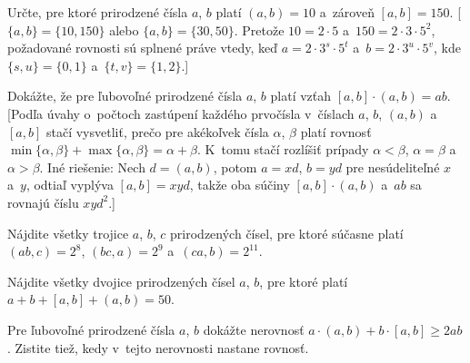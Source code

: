 {
Určte, pre ktoré prirodzené čísla $a$, $b$ platí
$(a,b)=10$ a~zároveň $[a,b]=150$. [$\{a,b\}=\{10,150\}$ alebo
$\{a,b\}=\{30,50\}$. Pretože $10=2\cdot5$
a~$150=2\cdot3\cdot5^2$, požadované rovnosti sú splnené práve vtedy, keď
$a=2\cdot3^{s}\cdot5^{t}$ a~$b=2\cdot3^{u}\cdot5^{v}$,
kde $\{s,u\}=\{0,1\}$ a~$\{t,v\}=\{1,2\}$.]

Dokážte, že pre ľubovoľné prirodzené čísla $a$, $b$ platí vzťah
$[a,b]\cdot(a,b)=ab$.
[Podľa úvahy o~počtoch zastúpení každého prvočísla
v~číslach $a$, $b$, $(a,b)$ a~$[a,b]$ stačí vysvetliť, prečo pre
akékoľvek čísla $\alpha$, $\beta$ platí rovnosť
$\min\{\alpha,\beta\}+\max\{\alpha,\beta\}=\alpha+\beta$. K~tomu stačí rozlíšiť
prípady $\alpha<\beta$, $\alpha=\beta$ a~$\alpha>\beta$.
Iné riešenie: Nech $d=(a,b)$, potom $a=xd$, $b=yd$
pre nesúdeliteľné $x$ a~$y$, odtiaľ vyplýva $[a,b]=xyd$, takže oba
súčiny $[a,b]\cdot(a,b)$ a~$ab$ sa rovnajú číslu $xyd^2$.]

Nájdite všetky trojice $a$, $b$, $c$ prirodzených čísel, pre
ktoré súčasne platí $(ab,c)=2^8$, $(bc,a)=2^9$ a~$(ca,b)=2^{11}$.
\vpravo{[50--C--S--1]}

Nájdite všetky dvojice prirodzených čísel $a$, $b$,
pre ktoré platí $a+b+[a,b]+(a,b)=50$.
\vpravo{[50--C--II--1]}

Pre ľubovoľné prirodzené čísla $a$, $b$ dokážte nerovnosť
$a\cdot(a,b)+b\cdot[a,b]\ge2ab$.  Zistite tiež,
kedy v~tejto nerovnosti nastane rovnosť.
\vpravo{[60--C--I--5]}
}

